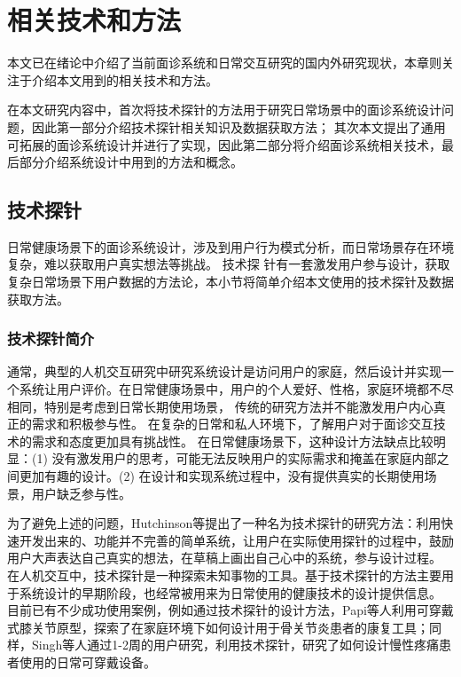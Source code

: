 \chapter{相关技术和方法}
本文已在绪论中介绍了当前面诊系统和日常交互研究的国内外研究现状，本章则关注于介绍本文用到的相关技术和方法。

在本文研究内容中，首次将技术探针的方法用于研究日常场景中的面诊系统设计问题，因此第一部分介绍技术探针相关知识及数据获取方法；
其次本文提出了通用可拓展的面诊系统设计并进行了实现，因此第二部分将介绍面诊系统相关技术，最后部分介绍系统设计中用到的方法和概念。

\section{技术探针}
日常健康场景下的面诊系统设计，涉及到用户行为模式分析，而日常场景存在环境复杂，难以获取用户真实想法等挑战。
技术探 针有一套激发用户参与设计，获取复杂日常场景下用户数据的方法论，本小节将简单介绍本文使用的技术探针及数据获取方法。
\subsection{技术探针简介}


通常，典型的人机交互研究中研究系统设计是访问用户的家庭，然后设计并实现一个系统让用户评价。在日常健康场景中，用户的个人爱好、性格，家庭环境都不尽相同，特别是考虑到日常长期使用场景，
传统的研究方法并不能激发用户内心真正的需求和积极参与性。
在复杂的日常和私人环境下，了解用户对于面诊交互技术的需求和态度更加具有挑战性。
在日常健康场景下，这种设计方法缺点比较明显\cite{Hutchinson2003Technology}：(1) 没有激发用户的思考，可能无法反映用户的实际需求和掩盖在家庭内部之间更加有趣的设计。(2) 在设计和实现系统过程中，没有提供真实的长期使用场景，用户缺乏参与性。

为了避免上述的问题，Hutchinson等\cite{Hutchinson2003Technology}提出了一种名为技术探针的研究方法：利用快速开发出来的、功能并不完善的简单系统，让用户在实际使用探针的过程中，鼓励用户大声表达自己真实的想法，在草稿上画出自己心中的系统，参与设计过程。
在人机交互中，技术探针是一种探索未知事物的工具。基于技术探针的方法主要用于系统设计的早期阶段\cite{turmo2020training}，也经常被用来为日常使用的健康技术的设计提供信息。
目前已有不少成功使用案例，例如通过技术探针的设计方法，Papi等人\cite{papi2015knee}利用可穿戴式膝关节原型，探索了在家庭环境下如何设计用于骨关节炎患者的康复工具；同样，Singh等人\cite{singh2017supporting}通过1-2周的用户研究，利用技术探针，研究了如何设计慢性疼痛患者使用的日常可穿戴设备。

